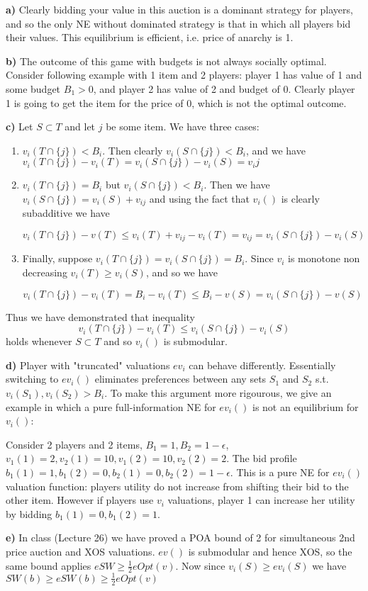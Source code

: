 \textbf{a)} Clearly bidding your value in this auction is a dominant strategy for players, and so the only NE without dominated strategy is that in which all players bid their values. This equilibrium is efficient, i.e. price of anarchy is 1. 

\textbf{b)} The outcome of this game with budgets is not always socially optimal. Consider following example with 1 item and 2 players: player 1 has value of 1 and some budget $B_1>0$, and player 2 has value of 2 and budget of $0$. Clearly player 1 is going to get the item for the price of 0, which is not the optimal outcome.

\textbf{c)} Let $S\subset T$ and let $j$ be some item. We have three cases:
\begin{enumerate}
\item $v_i(T\cap \{j\})< B_i$. Then clearly $v_i(S\cap \{j\})< B_i$, and we have $v_i(T\cap \{j\})-v_i(T) = v_i(S\cap \{j\})-v_i(S) = v_ij$
\item $v_i(T\cap \{j\})=B_i$ but $v_i(S\cap \{j\})< B_i$. Then we have $v_i(S\cap \{j\}) = v_i(S)+ v_{ij}$ and using the fact that $v_i()$ is clearly subadditive we have

$$v_i(T \cap \{j\})-v(T) \leq v_i(T)+v_{ij}-v_i(T) = v_{ij} = v_i(S\cap \{j\}) - v_i(S)$$
\item Finally, suppose $v_i(T\cap \{j\})=v_i(S\cap \{j\})=B_i$. Since $v_i$ is monotone non decreasing $v_i(T)\geq v_i(S)$, and so we have

$$v_i(T \cap \{j\})-v_i(T) = B_i - v_i(T) \leq B_i - v(S) = v_i(S\cap \{j\}) - v(S)$$
\end{enumerate}

Thus we have demonstrated that inequality $$v_i(T \cap \{j\})-v_i(T) \leq v_i(S\cap \{j\}) - v_i(S)$$ holds whenever $S \subset T$ and so $v_i()$ is submodular.

\textbf{d)} Player with "truncated" valuations $ev_i$ can behave differently. Essentially switching to $ev_i()$ eliminates preferences between any sets $S_1$ and $S_2$ s.t. $v_i(S_1),v_i(S_2)>B_i$. To make this argument more rigourous, we give an example in which a pure full-information NE for $ev_i()$ is not an equilibrium for $v_i()$:

Consider 2 players and 2 items, $B_1=1,B_2=1-\epsilon$, $v_1(1)=2, v_2(1) = 10, v_1(2) = 10, v_2(2) = 2$. The bid profile $b_1(1) = 1, b_1(2)=0,b_2(1) = 0, b_2(2)=1-\epsilon$. This is a pure NE for $ev_i()$ valuation function: players utility do not increase from shifting their bid to the other item. However if players use $v_i$ valuations, player 1 can increase her utility by bidding $b_1(1)=0, b_1(2) = 1$.  

\textbf{e)} In class (Lecture 26) we have proved a POA bound of 2 for simultaneous 2nd price auction and XOS valuations. $ev()$ is submodular and hence XOS, so the same bound applies $eSW\geq \frac 1 2 eOpt(v)$. Now since $v_i(S)\geq ev_i(S)$ we have $SW(b)\geq eSW(b)\geq \frac 1 2 eOpt (v)$
